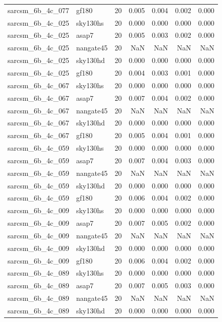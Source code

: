 \begin{tabular}{llrrrrr}
sarcsm\_6b\_4c\_077 & gf180 & 20 & 0.005 & 0.004 & 0.002 & 0.000 \\
sarcsm\_6b\_4c\_025 & sky130hs & 20 & 0.000 & 0.000 & 0.000 & 0.000 \\
sarcsm\_6b\_4c\_025 & asap7 & 20 & 0.005 & 0.003 & 0.002 & 0.000 \\
sarcsm\_6b\_4c\_025 & nangate45 & 20 & NaN & NaN & NaN & NaN \\
sarcsm\_6b\_4c\_025 & sky130hd & 20 & 0.000 & 0.000 & 0.000 & 0.000 \\
sarcsm\_6b\_4c\_025 & gf180 & 20 & 0.004 & 0.003 & 0.001 & 0.000 \\
sarcsm\_6b\_4c\_067 & sky130hs & 20 & 0.000 & 0.000 & 0.000 & 0.000 \\
sarcsm\_6b\_4c\_067 & asap7 & 20 & 0.007 & 0.004 & 0.002 & 0.000 \\
sarcsm\_6b\_4c\_067 & nangate45 & 20 & NaN & NaN & NaN & NaN \\
sarcsm\_6b\_4c\_067 & sky130hd & 20 & 0.000 & 0.000 & 0.000 & 0.000 \\
sarcsm\_6b\_4c\_067 & gf180 & 20 & 0.005 & 0.004 & 0.001 & 0.000 \\
sarcsm\_6b\_4c\_059 & sky130hs & 20 & 0.000 & 0.000 & 0.000 & 0.000 \\
sarcsm\_6b\_4c\_059 & asap7 & 20 & 0.007 & 0.004 & 0.003 & 0.000 \\
sarcsm\_6b\_4c\_059 & nangate45 & 20 & NaN & NaN & NaN & NaN \\
sarcsm\_6b\_4c\_059 & sky130hd & 20 & 0.000 & 0.000 & 0.000 & 0.000 \\
sarcsm\_6b\_4c\_059 & gf180 & 20 & 0.006 & 0.004 & 0.002 & 0.000 \\
sarcsm\_6b\_4c\_009 & sky130hs & 20 & 0.000 & 0.000 & 0.000 & 0.000 \\
sarcsm\_6b\_4c\_009 & asap7 & 20 & 0.007 & 0.005 & 0.002 & 0.000 \\
sarcsm\_6b\_4c\_009 & nangate45 & 20 & NaN & NaN & NaN & NaN \\
sarcsm\_6b\_4c\_009 & sky130hd & 20 & 0.000 & 0.000 & 0.000 & 0.000 \\
sarcsm\_6b\_4c\_009 & gf180 & 20 & 0.006 & 0.004 & 0.002 & 0.000 \\
sarcsm\_6b\_4c\_089 & sky130hs & 20 & 0.000 & 0.000 & 0.000 & 0.000 \\
sarcsm\_6b\_4c\_089 & asap7 & 20 & 0.007 & 0.005 & 0.003 & 0.000 \\
sarcsm\_6b\_4c\_089 & nangate45 & 20 & NaN & NaN & NaN & NaN \\
sarcsm\_6b\_4c\_089 & sky130hd & 20 & 0.000 & 0.000 & 0.000 & 0.000 \\

\end{tabular}
